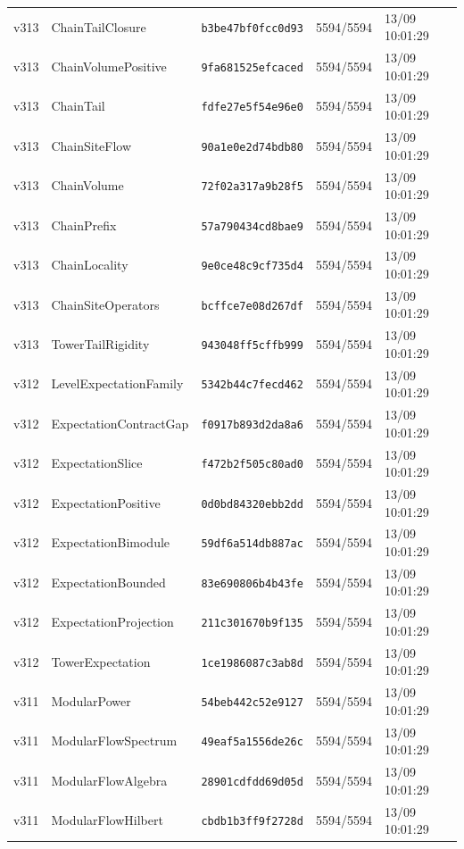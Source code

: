 \documentclass[11pt]{article}
\theoremstyle{definition}\newtheorem{deriv}{Derivation}
\begin{document}
{\begin{longtable}{@{}lllll@{}}
v313 & ChainTailClosure & \texttt{b3be47bf0fcc0d93} & 5594/5594 & 13/09 10:01:29 \\
v313 & ChainVolumePositive & \texttt{9fa681525efcaced} & 5594/5594 & 13/09 10:01:29 \\
v313 & ChainTail & \texttt{fdfe27e5f54e96e0} & 5594/5594 & 13/09 10:01:29 \\
v313 & ChainSiteFlow & \texttt{90a1e0e2d74bdb80} & 5594/5594 & 13/09 10:01:29 \\
v313 & ChainVolume & \texttt{72f02a317a9b28f5} & 5594/5594 & 13/09 10:01:29 \\
v313 & ChainPrefix & \texttt{57a790434cd8bae9} & 5594/5594 & 13/09 10:01:29 \\
v313 & ChainLocality & \texttt{9e0ce48c9cf735d4} & 5594/5594 & 13/09 10:01:29 \\
v313 & ChainSiteOperators & \texttt{bcffce7e08d267df} & 5594/5594 & 13/09 10:01:29 \\
v313 & TowerTailRigidity & \texttt{943048ff5cffb999} & 5594/5594 & 13/09 10:01:29 \\
v312 & LevelExpectationFamily & \texttt{5342b44c7fecd462} & 5594/5594 & 13/09 10:01:29 \\
v312 & ExpectationContractGap & \texttt{f0917b893d2da8a6} & 5594/5594 & 13/09 10:01:29 \\
v312 & ExpectationSlice & \texttt{f472b2f505c80ad0} & 5594/5594 & 13/09 10:01:29 \\
v312 & ExpectationPositive & \texttt{0d0bd84320ebb2dd} & 5594/5594 & 13/09 10:01:29 \\
v312 & ExpectationBimodule & \texttt{59df6a514db887ac} & 5594/5594 & 13/09 10:01:29 \\
v312 & ExpectationBounded & \texttt{83e690806b4b43fe} & 5594/5594 & 13/09 10:01:29 \\
v312 & ExpectationProjection & \texttt{211c301670b9f135} & 5594/5594 & 13/09 10:01:29 \\
v312 & TowerExpectation & \texttt{1ce1986087c3ab8d} & 5594/5594 & 13/09 10:01:29 \\
v311 & ModularPower & \texttt{54beb442c52e9127} & 5594/5594 & 13/09 10:01:29 \\
v311 & ModularFlowSpectrum & \texttt{49eaf5a1556de26c} & 5594/5594 & 13/09 10:01:29 \\
v311 & ModularFlowAlgebra & \texttt{28901cdfdd69d05d} & 5594/5594 & 13/09 10:01:29 \\
v311 & ModularFlowHilbert & \texttt{cbdb1b3ff9f2728d} & 5594/5594 & 13/09 10:01:29 \\

\end{longtable}}
\end{document}
